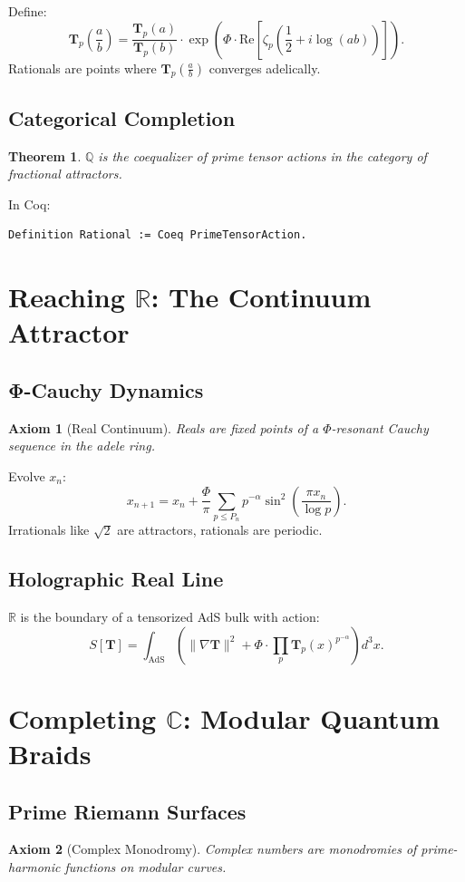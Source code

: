\documentclass{article}
\theoremstyle{plain}
\newtheorem{theorem}{Theorem}
\newtheorem{axiom}{Axiom}
\begin{document}
Define:
\[
\mathbf{T}_p\left(\frac{a}{b}\right) = \frac{\mathbf{T}_p(a)}{\mathbf{T}_p(b)} \cdot \exp\left( \Phi \cdot \text{Re}\left[\zeta_p\left(\frac{1}{2} + i \log(ab)\right)\right] \right).
\]
Rationals are points where $\mathbf{T}_p\left(\frac{a}{b}\right)$ converges adelically.

\subsection{Categorical Completion}
\begin{theorem}
$\mathbb{Q}$ is the coequalizer of prime tensor actions in the category of fractional attractors.
\end{theorem}
In Coq:
\begin{verbatim}
Definition Rational := Coeq PrimeTensorAction.
\end{verbatim}

\section{Reaching $\mathbb{R}$: The Continuum Attractor}
\subsection{Φ-Cauchy Dynamics}
\begin{axiom}[Real Continuum]
Reals are fixed points of a $\Phi$-resonant Cauchy sequence in the adele ring.
\end{axiom}

Evolve $x_n$:
\[
x_{n+1} = x_n + \frac{\Phi}{\pi} \sum_{p \leq P_n} p^{-\alpha} \sin^2\left( \frac{\pi x_n}{\log p} \right).
\]
Irrationals like $\sqrt{2}$ are attractors, rationals are periodic.

\subsection{Holographic Real Line}
\begin{conjecture}
$\mathbb{R}$ is the boundary of a tensorized AdS bulk with action:
\[
S[\mathbf{T}] = \int_{\text{AdS}} \left( \|\nabla \mathbf{T}\|^2 + \Phi \cdot \prod_p \mathbf{T}_p(x)^{p^{-\alpha}} \right) d^3x.
\]
\end{conjecture}

\section{Completing $\mathbb{C}$: Modular Quantum Braids}
\subsection{Prime Riemann Surfaces}
\begin{axiom}[Complex Monodromy]
Complex numbers are monodromies of prime-harmonic functions on modular curves.
\end{axiom}
\end{document}
